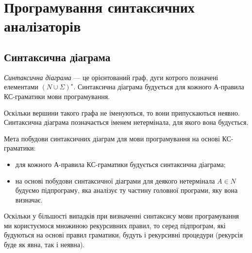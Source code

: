 \setcounter{section}{10}

\section{Програмування синтаксичних аналізаторів}

\subsection{Синтаксична діаграма}

\textit{Синтаксична діаграма} --- це орієнтований граф, дуги котрого позначені елементами $(N \cup \Sigma)^\star$. Синтаксична діаграма будується для кожного $А$-правила КС-граматики мови програмування. \medskip

Оскільки вершини такого графа не іменуються, то вони припускаються неявно. Синтаксична діаграма позначається іменем нетермінала, для якого вона будується. \medskip

Мета побудови синтаксичних діаграм для мови програмування на основі КС-граматики:
\begin{itemize}
	\item для кожного $А$-правила КС-граматики будується синтаксична діаграма;
	\item на основі побудови синтаксичної діаграми для деякого нетермінала $A \in N$ будуємо підпрограму, яка аналізує ту частину головної програми, яку вона визначає.
\end{itemize}

Оскільки у більшості випадків при визначенні синтаксису мови програмування ми користуємося множиною рекурсивних правил, то серед підпрограм, які будуються на основі правил граматики, будуть і рекурсивні процедури (рекурсія буде як явна, так і неявна). \medskip


